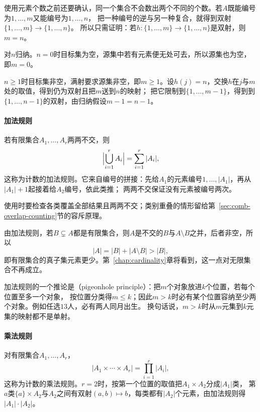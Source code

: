 使用元素个数之前还要确认，同一个集合不会数出两个不同的个数。若$A$既能编号为$1,\ldots,m$又能编号为$1,\ldots,n$，
把一种编号的逆与另一种复合，就得到双射$\{1,\ldots,m\}\to\{1,\ldots,n\}$。
所以只需证明：若$h:\{1,\ldots,m\}\to\{1,\ldots,n\}$是双射，则$m=n$。

对$n$归纳。$n=0$时目标集为空，源集中若有元素便无处可去，所以源集也为空，即$m=0$。

$n\geq1$时目标集非空，满射要求源集非空，即$m\geq1$。设$h(j)=n$，交换$h$在$j$与$m$处的取值，得到仍为双射且把$m$送到$n$的映射；
把它限制到$\{1,\ldots,m-1\}$，得到到$\{1,\ldots,n-1\}$的双射，由归纳假设$m-1=n-1$。

\paragraph{加法规则}
若有限集合$A_1,\ldots,A_r$两两不交，则
\begin{equation}
 \Bigl|\bigcup_{i=1}^r A_i\Bigr|=\sum_{i=1}^r|A_i|,
 \label{eq:comb-addition-rule}
\end{equation}
这称为计数的加法规则。它来自编号的拼接：先给$A_1$的元素编号$1,\ldots,|A_1|$，再从$|A_1|+1$起接着给$A_2$编号，依此类推；
两两不交保证没有元素被编号两次。

使用时要检查各类覆盖全部结果且两两不交；类别重叠的情形留给第~\ref{sec:comb-overlap-counting}节的容斥原理。

由加法规则，若$B\subsetneq A$都是有限集合，则$A$是不交的$B$与$A\setminus B$之并，后者非空，所以
\[
 |A|=|B|+|A\setminus B|>|B|,
\]
即有限集合的真子集元素更少。第~\ref{chap:cardinality}章将看到，这一点对无限集合不再成立。

加法规则的一个推论是（pigeonhole principle）：把$m$个对象放进$k$个位置，若每个位置至多一个对象，
按位置分类得$m\leq k$；因此$m>k$时必有某个位置容纳至少两个对象。例如任选$13$人，必有两人同月出生。
换句话说，$m>k$时从$m$元集到$k$元集的映射都不是单射。

\paragraph{乘法规则}
\label{sec:comb-stepwise-counting}
对有限集合$A_1,\ldots,A_r$，
\begin{equation}
 |A_1\times\cdots\times A_r|=\prod_{i=1}^r|A_i|,
 \label{eq:comb-multiplication-rule}
\end{equation}
这称为计数的乘法规则。$r=2$时，按第一个位置的取值把$A_1\times A_2$分成$|A_1|$类，
第$a$类$\{a\}\times A_2$与$A_2$之间有双射$(a,b)\mapsto b$，每类都有$|A_2|$个元素，由加法规则得$|A_1|\cdot|A_2|$。


